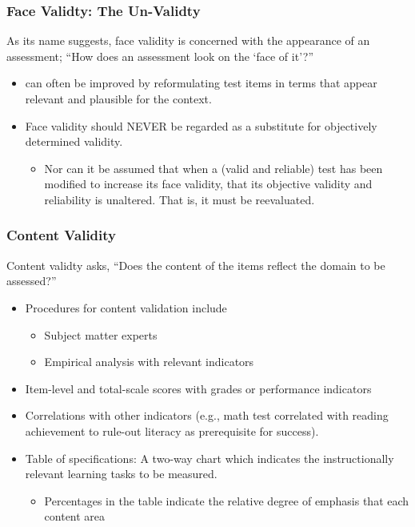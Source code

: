 \documentclass[
  english,
]{book}
\providecommand{\tightlist}{%
  \setlength{\itemsep}{0pt}\setlength{\parskip}{0pt}}
\begin{document}
\hypertarget{face-validty-the-un-validty}{%
\subsubsection{Face Validty: The Un-Validty}\label{face-validty-the-un-validty}}

As its name suggests, face validity is concerned with the appearance of an assessment; ``How does an assessment look on the `face of it'?''

\begin{itemize}
\tightlist
\item
  can often be improved by reformulating test items in terms that appear relevant and plausible for the context.
\item
  Face validity should NEVER be regarded as a substitute for objectively determined validity.

  \begin{itemize}
  \tightlist
  \item
    Nor can it be assumed that when a (valid and reliable) test has been modified to increase its face validity, that its objective validity and reliability is unaltered. That is, it must be reevaluated.
  \end{itemize}
\end{itemize}

\hypertarget{content-validity}{%
\subsubsection{Content Validity}\label{content-validity}}

Content validty asks, ``Does the content of the items reflect the domain to be assessed?''

\begin{itemize}
\tightlist
\item
  Procedures for content validation include

  \begin{itemize}
  \tightlist
  \item
    Subject matter experts
  \item
    Empirical analysis with relevant indicators
  \end{itemize}
\item
  Item-level and total-scale scores with grades or performance indicators
\item
  Correlations with other indicators (e.g., math test correlated with reading achievement to rule-out literacy as prerequisite for success).
\item
  Table of specifications: A two-way chart which indicates the instructionally relevant learning tasks to be measured.

  \begin{itemize}
  \tightlist
  \item
    Percentages in the table indicate the relative degree of emphasis that each content area
  \end{itemize}
\end{itemize}
\end{document}
